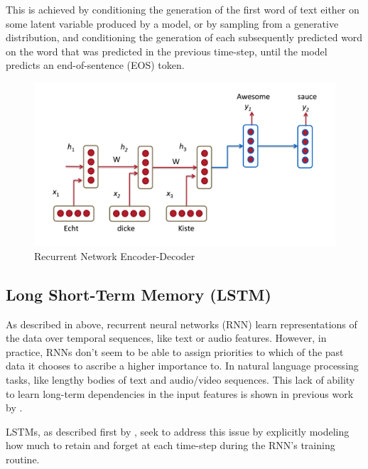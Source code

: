 This is achieved by conditioning the generation of the first word of text either on some latent variable produced by a model, or by sampling from a generative distribution, and conditioning the generation of each subsequently predicted word on the word that was predicted in the previous time-step, until the model predicts an end-of-sentence (EOS) token.

\begin{figure}[ht]
	\centering
	\includegraphics[width=\textwidth]{images/rnn-nmt}
	\caption{\label{fig:rnn-nmt} Recurrent Network Encoder-Decoder}
\end{figure}


\subsection{Long Short-Term Memory (LSTM)}

As described in above, recurrent neural networks (RNN) learn representations of the data over temporal sequences, like text or audio features. However, in practice, RNNs don't seem to be able to assign priorities to which of the past data it chooses to ascribe a higher importance to. In natural language processing tasks, like lengthy bodies of text and audio/video sequences. This lack of ability to learn long-term dependencies in the input features is shown in previous work by \cite{bengio1994learning}.

LSTMs, as described first by \cite{hochreiter1997long}, seek to address this issue by explicitly modeling how much to retain and forget at each time-step during the RNN's training routine.

